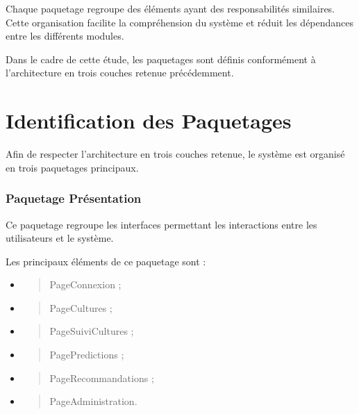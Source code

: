 Chaque paquetage regroupe des éléments ayant des responsabilités
similaires. Cette organisation facilite la compréhension du système et
réduit les dépendances entre les différents modules.

Dans le cadre de cette étude, les paquetages sont définis conformément à
l'architecture en trois couches retenue précédemment.

\hypertarget{identification-des-paquetages}{%
\section{Identification des Paquetages}\label{identification-des-paquetages}}

Afin de respecter l'architecture en trois couches retenue, le système
est organisé en trois paquetages principaux.

\hypertarget{paquetage-pruxe9sentation}{%
\subsubsection{Paquetage Présentation}\label{paquetage-pruxe9sentation}}

Ce paquetage regroupe les interfaces permettant les interactions entre
les utilisateurs et le système.

Les principaux éléments de ce paquetage sont :

\begin{itemize}
\item
  \begin{quote}
  PageConnexion ;
  \end{quote}
\item
  \begin{quote}
  PageCultures ;
  \end{quote}
\item
  \begin{quote}
  PageSuiviCultures ;
  \end{quote}
\item
  \begin{quote}
  PagePredictions ;
  \end{quote}
\item
  \begin{quote}
  PageRecommandations ;
  \end{quote}
\item
  \begin{quote}
  PageAdministration.
  \end{quote}
\end{itemize}

